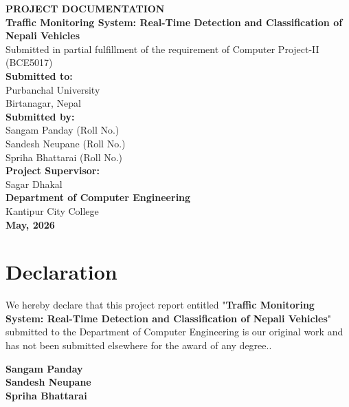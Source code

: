 \documentclass[12pt,a4paper]{report}
\begin{document}
\begin{titlepage}
    \thispagestyle{empty}
    \centering
    {\Large \textbf{PROJECT DOCUMENTATION}}\\[1cm]

    {\Large \textbf{Traffic Monitoring System: Real-Time Detection and Classification of Nepali Vehicles}}\\
    {\large Submitted in partial fulfillment of the requirement of
Computer Project-II (BCE5017)
}\\[0.4cm]
{\large \textbf{Submitted to:}}\\[0.5cm]
{\large Purbanchal University}\\[0.5cm]
{\large Birtanagar, Nepal}\\[0.5cm]

    
    {\large \textbf{Submitted by:}}\\[0.2cm]
    {\large {Sangam Panday (Roll No.)}}\\
    {\large {Sandesh Neupane (Roll No.)}}\\
    {\large {Spriha Bhattarai (Roll No.)}}\\[1.5cm]

    {\large \textbf{Project Supervisor:}}\\[0.5cm]
{\large Sagar Dhakal}\\[0.5cm]

    {\large \textbf{Department of Computer Engineering}}\\
    {\large Kantipur City College}\\


    \vfill
    {\large \textbf{May, 2026}}
\end{titlepage}

\chapter*{Declaration}

We hereby declare that this project report entitled "\textbf{Traffic Monitoring System: Real-Time Detection and Classification of Nepali Vehicles}" submitted to the Department of Computer Engineering is our original work and has not been submitted elsewhere for the award of any degree..

\vspace{1cm}
\noindent\textbf{Sangam Panday}\\
\textbf{Sandesh Neupane}\\
\textbf{Spriha Bhattarai}
\end{document}
